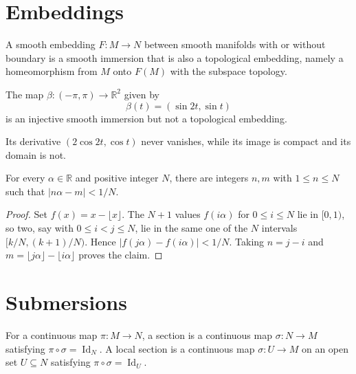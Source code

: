 \section{Embeddings}

\begin{definition}
\label{def:4-24-extra-1}



A smooth embedding $F:M\to N$ between smooth manifolds with or without boundary is a smooth immersion that is also a topological embedding, namely a homeomorphism from $M$ onto $F(M)$ with the subspace topology.
\end{definition}

\begin{example}
\label{ex:4-19}




The map $\beta:(-\pi,\pi)\to\mathbb R^2$ given by
\[
\beta(t)=(\sin 2t,\sin t)
\]
is an injective smooth immersion but not a topological embedding.

\sketch Its derivative $(2\cos 2t,\cos t)$ never vanishes, while its image is compact and its domain is not.
\end{example}

\begin{lemma}
\label{lem:4-21}




For every $\alpha\in\mathbb R$ and positive integer $N$, there are integers $n,m$ with $1\le n\le N$ such that $|n\alpha-m|<1/N$.
\end{lemma}

\begin{proof}

\sketch
Set $f(x)=x-\lfloor x\rfloor$. The $N+1$ values $f(i\alpha)$ for $0\le i\le N$ lie in $[0,1)$, so two, say with $0\le i<j\le N$, lie in the same one of the $N$ intervals $[k/N,(k+1)/N)$. Hence $|f(j\alpha)-f(i\alpha)|<1/N$. Taking $n=j-i$ and $m=\lfloor j\alpha\rfloor-\lfloor i\alpha\rfloor$ proves the claim.
\end{proof}


\section{Submersions}

\begin{definition}
\label{def:4-25-extra-1}



For a continuous map $\pi:M\to N$, a section is a continuous map $\sigma:N\to M$ satisfying $\pi\circ\sigma=\operatorname{Id}_N$. A local section is a continuous map $\sigma:U\to M$ on an open set $U\subseteq N$ satisfying $\pi\circ\sigma=\operatorname{Id}_U$.
\end{definition}

